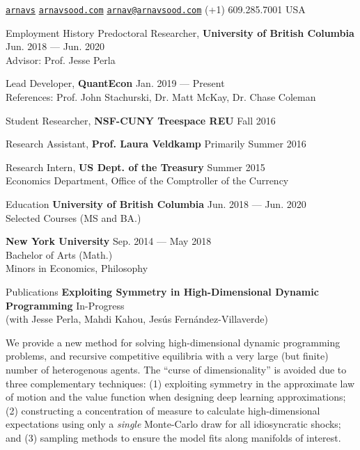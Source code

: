 \documentclass{resume} %
\begin{document}
 \href{https://github.com/arnavs}{\tt arnavs} \vline \hspace{0.5 em} {} \href{https://arnavsood.com}{\tt arnavsood.com} \vline \hspace{0.5 em} {} \href{mailto:arnav@arnavsood.com}{\tt arnav@arnavsood.com} \vline \hspace{0.5 em}  (+1) 609.285.7001 \vline \hspace{0.5 em}  USA 

\begin{rSection}{Employment History}
Predoctoral Researcher, {\bf University of British Columbia} \hfill {Jun. 2018 --- Jun. 2020} 
\\ Advisor: Prof. Jesse Perla \smallskip 

Lead Developer, {\bf QuantEcon} \hfill {Jan. 2019 --- Present}
\\ References: Prof. John Stachurski, Dr. Matt McKay, Dr. Chase Coleman

Student Researcher, {\bf NSF-CUNY Treespace REU} \hfill {Fall 2016}

Research Assistant, {\bf Prof. Laura Veldkamp} \hfill {Primarily Summer 2016}

Research Intern, {\bf US Dept. of the Treasury} \hfill {Summer 2015}
\\ Economics Department, Office of the Comptroller of the Currency
\end{rSection}

\begin{rSection}{Education}
{\bf University of British Columbia} \hfill {Jun. 2018 --- Jun. 2020} 
\\ Selected Courses (MS and BA.)  %

{\bf New York University} \hfill {Sep. 2014 --- May 2018} 
\\ Bachelor of Arts (Math.) %
\\ Minors in Economics, Philosophy 
\end{rSection}

\begin{rSection}{Publications}
    {\bf Exploiting Symmetry in High-Dimensional Dynamic Programming} \hfill {In-Progress} 
    \\ (with Jesse Perla, Mahdi Kahou, Jes\'{u}s Fern\'{a}ndez-Villaverde)    

    We provide a new method for solving high-dimensional dynamic programming problems, and recursive competitive equilibria with a very large (but finite) number of heterogenous agents.  The ``curse of dimensionality'' is avoided due to three complementary techniques: (1) exploiting symmetry in the approximate law of motion and the value function when designing deep learning approximations; (2) constructing a concentration of measure to calculate high-dimensional expectations using only a \textit{single} Monte-Carlo draw for all idiosyncratic shocks; and (3) sampling methods to ensure the model fits along manifolds of interest. 
\end{rSection}
\end{document}
